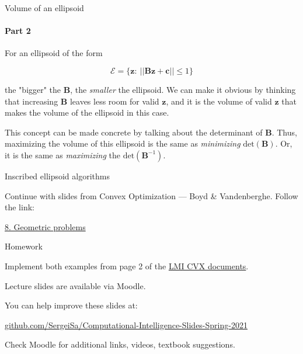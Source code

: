 \documentclass{beamer}
\begin{document}
\begin{frame}{Volume of an ellipsoid}
\framesubtitle{Part 2}
\begin{flushleft}

For an ellipsoid of the form

\begin{equation}
    \mathcal{E} = \{ \mathbf{z}: \ || \mathbf{B}\mathbf{z} + \mathbf{c} || \leq 1 \}
\end{equation}

the "bigger" the $\mathbf{B}$, the \emph{smaller} the ellipsoid. We can make it obvious by thinking that increasing $\mathbf{B}$ leaves less room for valid $\mathbf{z}$, and it is the volume of valid $\mathbf{z}$ that makes the volume of the ellipsoid in this case.

\bigskip

This concept can be made concrete by talking about the determinant of $\mathbf{B}$. Thus, maximizing the volume of this ellipsoid is the same as \emph{minimizing} $\text{det}(\mathbf{B})$. Or, it is the same as \emph{maximizing} the $\text{det}(\mathbf{B}^{-1})$.
 
\end{flushleft}
\end{frame}



\begin{frame}{Inscribed ellipsoid algorithms}
\begin{flushleft}

Continue with slides from Convex Optimization — Boyd \& Vandenberghe. Follow the link:

\bigskip

\centerline{\href{https://see.stanford.edu/materials/lsocoee364a/08GeometricalProbs.pdf}{8. Geometric problems}}

\end{flushleft}
\end{frame}



\begin{frame}{Homework}
\begin{flushleft}


Implement both examples from page 2 of the \href{http://stanford.edu/class/ee363/notes/lmi-cvx.pdf}{LMI CVX documents}.

\end{flushleft}
\end{frame}





\begin{frame}
\centerline{Lecture slides are available via Moodle.}
\bigskip
\centerline{You can help improve these slides at:}
\centerline{
\textcolor{blue}{\href{https://github.com/SergeiSa/Computational-Intelligence-Slides-Spring-2021}{github.com/SergeiSa/Computational-Intelligence-Slides-Spring-2021}}
}
\bigskip

\textcolor{black}{}
\bigskip

\centerline{Check Moodle for additional links, videos, textbook suggestions.}
\end{frame}
\end{document}
